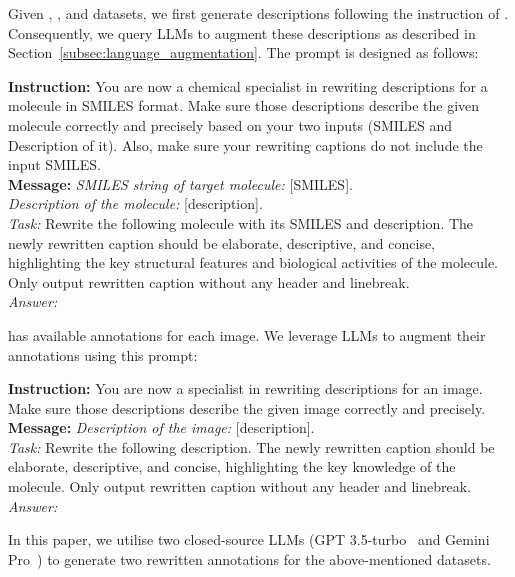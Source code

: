 Given \bace, \hiv, and \esol datasets, we first generate descriptions following the instruction of \cite{ZZM24}. 
Consequently, we query LLMs to augment these descriptions as described in Section~\ref{subsec:language_augmentation}. 
The prompt is designed as follows:
\begin{mybox}
    \textbf{Instruction: }
    You are now a chemical specialist in rewriting descriptions for a molecule in SMILES format. 
    Make sure those descriptions describe the given molecule correctly and precisely based on your two inputs (SMILES and Description of it). 
    Also, make sure your rewriting captions do not include the input SMILES.
    \\
    \textbf{Message: }
    \emph{SMILES string of target molecule:} [SMILES]. \\
    \emph{Description of the molecule:} [description]. \\
    \emph{Task:} Rewrite the following molecule with its SMILES and description. 
    The newly rewritten caption should be elaborate, descriptive, and concise, highlighting the key structural features and biological activities of the molecule. 
    Only output rewritten caption without any header and linebreak. \\
    \emph{Answer:}
\end{mybox}

\image has available annotations for each image. 
We leverage LLMs to augment their annotations using this prompt:
\begin{mybox}
    \textbf{Instruction: }
    You are now a specialist in rewriting descriptions for an image. 
    Make sure those descriptions describe the given image correctly and precisely. 
    \\
    \textbf{Message: }
    \emph{Description of the image:} [description]. \\
    \emph{Task:} Rewrite the following description. 
    The newly rewritten caption should be elaborate, descriptive, and concise, highlighting the key knowledge of the molecule. 
    Only output rewritten caption without any header and linebreak. \\
    \emph{Answer:}
\end{mybox}

In this paper, we utilise two closed-source LLMs (GPT 3.5-turbo~\cite{AAAA23} and Gemini Pro~\cite{Gemini24}) to generate two rewritten annotations for the above-mentioned datasets. 


